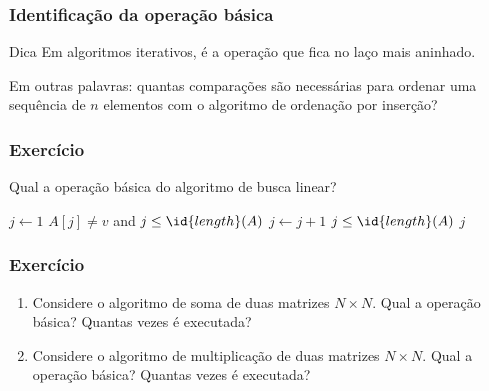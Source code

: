 \documentclass[handout]{beamer}
\begin{document}
\begin{frame}
\frametitle{Identificação da operação básica}

\begin{block}{Dica}
Em algoritmos iterativos, é a operação que fica no laço mais aninhado.
\end{block}

\pause



  Em outras palavras: quantas comparações são necessárias para ordenar uma
  sequência de $n$ elementos com o algoritmo de ordenação por inserção?

\end{frame}

\begin{frame}
  \frametitle{Exercício}

Qual a operação básica do algoritmo de busca linear?
\begin{codebox}
\li $j \gets 1$
\li \While $A[j] \neq v$ and $j \le \id{length}(A)$
\li \Do
      $j \gets j+1$
    \End
\li \If $j \le \id{length}(A)$
\li \Then
      \Return $j$
\li \Else
      \Return {}
    \End
\end{codebox}  

\end{frame}

\begin{frame}
  \frametitle{Exercício}

  \begin{enumerate}
  \item Considere o algoritmo de soma de duas matrizes $N \times N$.
    Qual a operação básica? Quantas vezes é executada?
  \item Considere o algoritmo de multiplicação de duas matrizes $N \times N$.
    Qual a operação básica? Quantas vezes é executada?
  \end{enumerate}

\end{frame}
\end{document}
